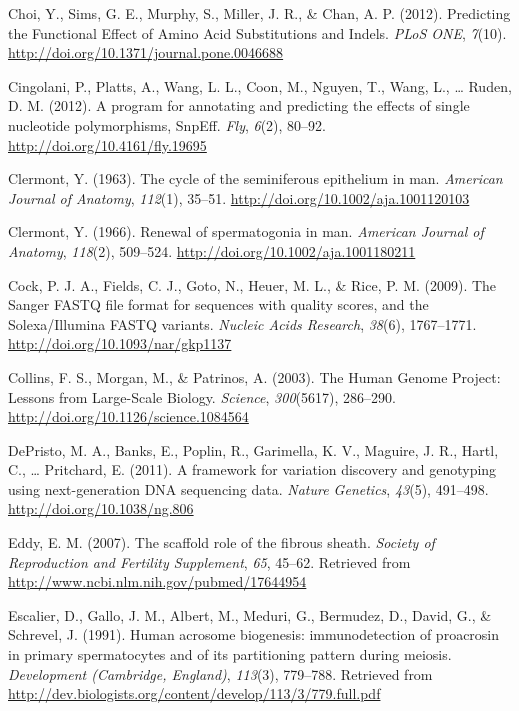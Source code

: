\documentclass[12pt,twoside]{reedthesis}
\theoremstyle{definition}
\theoremstyle{definition}
\theoremstyle{remark}
\begin{document}
  \hypertarget{ref-Choi2012}{}
  Choi, Y., Sims, G. E., Murphy, S., Miller, J. R., \& Chan, A. P. (2012).
  Predicting the Functional Effect of Amino Acid Substitutions and Indels.
  \emph{PLoS ONE}, \emph{7}(10).
  \url{http://doi.org/10.1371/journal.pone.0046688}
  
  \hypertarget{ref-Cingolani2012}{}
  Cingolani, P., Platts, A., Wang, L. L., Coon, M., Nguyen, T., Wang, L.,
  \ldots{} Ruden, D. M. (2012). A program for annotating and predicting
  the effects of single nucleotide polymorphisms, SnpEff. \emph{Fly},
  \emph{6}(2), 80--92. \url{http://doi.org/10.4161/fly.19695}
  
  \hypertarget{ref-Clermont1963}{}
  Clermont, Y. (1963). The cycle of the seminiferous epithelium in man.
  \emph{American Journal of Anatomy}, \emph{112}(1), 35--51.
  \url{http://doi.org/10.1002/aja.1001120103}
  
  \hypertarget{ref-Clermont1966}{}
  Clermont, Y. (1966). Renewal of spermatogonia in man. \emph{American
  Journal of Anatomy}, \emph{118}(2), 509--524.
  \url{http://doi.org/10.1002/aja.1001180211}
  
  \hypertarget{ref-Cock2009}{}
  Cock, P. J. A., Fields, C. J., Goto, N., Heuer, M. L., \& Rice, P. M.
  (2009). The Sanger FASTQ file format for sequences with quality scores,
  and the Solexa/Illumina FASTQ variants. \emph{Nucleic Acids Research},
  \emph{38}(6), 1767--1771. \url{http://doi.org/10.1093/nar/gkp1137}
  
  \hypertarget{ref-Collins2003}{}
  Collins, F. S., Morgan, M., \& Patrinos, A. (2003). The Human Genome
  Project: Lessons from Large-Scale Biology. \emph{Science},
  \emph{300}(5617), 286--290. \url{http://doi.org/10.1126/science.1084564}
  
  \hypertarget{ref-DePristo2011}{}
  DePristo, M. A., Banks, E., Poplin, R., Garimella, K. V., Maguire, J.
  R., Hartl, C., \ldots{} Pritchard, E. (2011). A framework for variation
  discovery and genotyping using next-generation DNA sequencing data.
  \emph{Nature Genetics}, \emph{43}(5), 491--498.
  \url{http://doi.org/10.1038/ng.806}
  
  \hypertarget{ref-Eddy2007}{}
  Eddy, E. M. (2007). The scaffold role of the fibrous sheath.
  \emph{Society of Reproduction and Fertility Supplement}, \emph{65},
  45--62. Retrieved from \url{http://www.ncbi.nlm.nih.gov/pubmed/17644954}
  
  \hypertarget{ref-Escalier1991}{}
  Escalier, D., Gallo, J. M., Albert, M., Meduri, G., Bermudez, D., David,
  G., \& Schrevel, J. (1991). Human acrosome biogenesis: immunodetection
  of proacrosin in primary spermatocytes and of its partitioning pattern
  during meiosis. \emph{Development (Cambridge, England)}, \emph{113}(3),
  779--788. Retrieved from
  \url{http://dev.biologists.org/content/develop/113/3/779.full.pdf}
  
\end{document}
